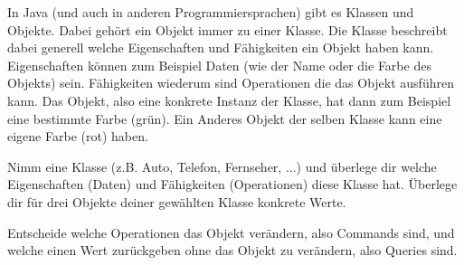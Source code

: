 \begin{questions}

    \renewcommand{\workingtimeMinutes}{15}

    In Java (und auch in anderen Programmiersprachen) gibt es Klassen und Objekte.
    Dabei gehört ein Objekt immer zu einer Klasse.
    Die Klasse beschreibt dabei generell welche Eigenschaften und Fähigkeiten ein Objekt haben kann.
    Eigenschaften können zum Beispiel Daten (wie der Name oder die Farbe des Objekts) sein.
    Fähigkeiten wiederum sind Operationen die das Objekt ausführen kann.
    Das Objekt, also eine konkrete Instanz der Klasse, hat dann zum Beispiel eine bestimmte Farbe (grün).
    Ein Anderes Objekt der selben Klasse kann eine eigene Farbe (rot) haben.

    Nimm eine Klasse (z.B. Auto, Telefon, Fernseher, ...) und überlege dir welche Eigenschaften (Daten) und Fähigkeiten (Operationen) diese Klasse hat.
    Überlege dir für drei Objekte deiner gewählten Klasse konkrete Werte.

    Entscheide welche Operationen das Objekt verändern, also Commands sind, und welche einen Wert zurückgeben ohne das Objekt zu verändern, also Queries sind.



\end{questions}
